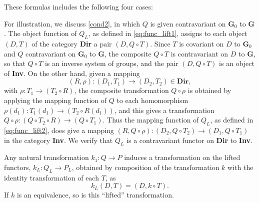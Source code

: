 \documentclass[11pt,a4paper]{report}
\begin{document}
These formulas includes the following four cases:

For illustration, we discuss \cref{cond2}, in which $Q$ is given contravariant on $\mathbf{G}_0$ to $\mathbf{G}$. The object
function of $Q_L$, as defined in \cref{eq:func_lift1}, assigns to each object $(D,T)$ of the category
\textbf{Dir} a pair $(D,Q\circ T)$. Since  $T$ is covariant on $D$ to $\mathbf{G}_0$ and $Q$ contravariant on $\mathbf{G}_0$
to $\mathbf{G}$, the composite $Q\circ T$ is contravariant on $D$ to $\mathbf{G}$, so that $Q\circ T$ is an inverse system
of groups, and the pair $(D,Q\circ T)$ is an object of \textbf{Inv}. On the other hand, given a mapping
\begin{equation*}
	(R,\rho):(D_1,T_1)\rightarrow (D_2,T_2)\in\mathbf{Dir},
\end{equation*}
with $\rho:T_1\rightarrow (T_2\circ R)$, the composite transformation $Q\circ\rho$ is obtained by applying the mapping function
of $Q$ to each homomorphism $\rho(d_1):T_1(d_1)\rightarrow(T_2\circ R(d_1))$, and this gives a transformation
$Q\circ\rho:(Q\circ T_2\circ R)\rightarrow (Q\circ T_1)$. Thus the mapping function of $Q_L$, as defined in \cref{eq:func_lift2},
does give a mapping $(R,Q\circ\rho):(D_2,Q\circ T_2)\rightarrow (D_1,Q\circ T_1)$ in the category \textbf{Inv}. We verify that
$Q_L$ is a contravariant functor on \textbf{Dir} to \textbf{Inv}.

Any natural transformation $k_1:Q\rightarrow P$ induces a transformation on the lifted functors, $k_L:Q_L\rightarrow P_L$, obtained
by composition of the transformation $k$ with the identity transformation of each $T$, as
\begin{equation*}
	k_L(D,T)=(D,k\circ T).
\end{equation*}
If $k$ is an equivalence, so is this ``lifted'' transformation.
\end{document}
